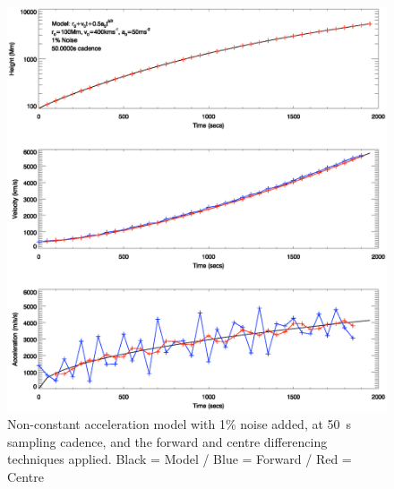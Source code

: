 \documentclass[namedreferences]{SolarPhysics}
\begin{document}
\begin{article}
\begin{figure}
 \centerline{\includegraphics[width=\linewidth]{images/nonconst_a_forward_centre_noise001_cadence50.ps}}
   \caption{Non-constant acceleration model with 1\% noise added, at 50~s sampling cadence, and the forward and centre differencing techniques applied. Black = Model / Blue = Forward / Red = Centre}
    \label{nonconst_a_forward_centre_noise001_cadence50}
\end{figure}


\end{article}
\end{document}
